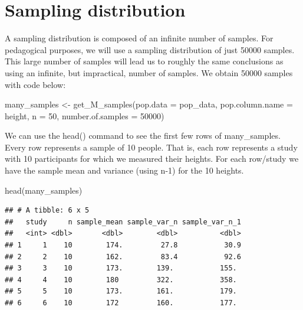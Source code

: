 \documentclass[
]{krantz}
\makeatletter
\newenvironment{Shaded}{\begin{snugshade}}{\end{snugshade}}
\newcommand{\AttributeTok}[1]{\textcolor[rgb]{0.61,0.61,0.61}{#1}}
\newcommand{\DecValTok}[1]{\textcolor[rgb]{0.06,0.06,0.06}{#1}}
\newcommand{\FunctionTok}[1]{\textcolor[rgb]{0,0,0}{#1}}
\newcommand{\NormalTok}[1]{#1}
\newcommand{\OtherTok}[1]{\textcolor[rgb]{0.37,0.37,0.37}{#1}}
\newenvironment{kframe}{%
\medskip{}
\setlength{\fboxsep}{.8em}
 \def\at@end@of@kframe{}%
 \ifinner\ifhmode%
  \def\at@end@of@kframe{\end{minipage}}%
  \begin{minipage}{\columnwidth}%
 \fi\fi%
 \def\FrameCommand##1{\hskip\@totalleftmargin \hskip-\fboxsep
 \colorbox{shadecolor}{##1}\hskip-\fboxsep
     \hskip-\linewidth \hskip-\@totalleftmargin \hskip\columnwidth}%
 \MakeFramed {\advance\hsize-\width
   \@totalleftmargin\z@ \linewidth\hsize
   \@setminipage}}%
 {\par\unskip\endMakeFramed%
 \at@end@of@kframe}
\renewenvironment{Shaded}{\begin{kframe}}{\end{kframe}}
\makeatother
\begin{document}
\hypertarget{sampling-distribution}{%
\section{Sampling distribution}\label{sampling-distribution}}

A sampling distribution is composed of an infinite number of samples. For pedagogical purposes, we will use a sampling distribution of just 50000 samples. This large number of samples will lead us to roughly the same conclusions as using an infinite, but impractical, number of samples. We obtain 50000 samples with code below:

\begin{Shaded}
\begin{Highlighting}[]
\NormalTok{many\_samples }\OtherTok{\textless{}{-}} \FunctionTok{get\_M\_samples}\NormalTok{(}\AttributeTok{pop.data =}\NormalTok{ pop\_data, }
                              \AttributeTok{pop.column.name =}\NormalTok{ height,}
                              \AttributeTok{n =} \DecValTok{50}\NormalTok{,}
                              \AttributeTok{number.of.samples =} \DecValTok{50000}\NormalTok{)}
\end{Highlighting}
\end{Shaded}

We can use the head() command to see the first few rows of many\_samples. Every row represents a sample of 10 people. That is, each row represents a study with 10 participants for which we measured their heights. For each row/study we have the sample mean and variance (using n-1) for the 10 heights.

\begin{Shaded}
\begin{Highlighting}[]
\FunctionTok{head}\NormalTok{(many\_samples)}
\end{Highlighting}
\end{Shaded}

\begin{verbatim}
## # A tibble: 6 x 5
##   study     n sample_mean sample_var_n sample_var_n_1
##   <int> <dbl>       <dbl>        <dbl>          <dbl>
## 1     1    10        174.         27.8           30.9
## 2     2    10        162.         83.4           92.6
## 3     3    10        173.        139.           155. 
## 4     4    10        180         322.           358. 
## 5     5    10        173.        161.           179. 
## 6     6    10        172         160.           177.
\end{verbatim}
\end{document}
